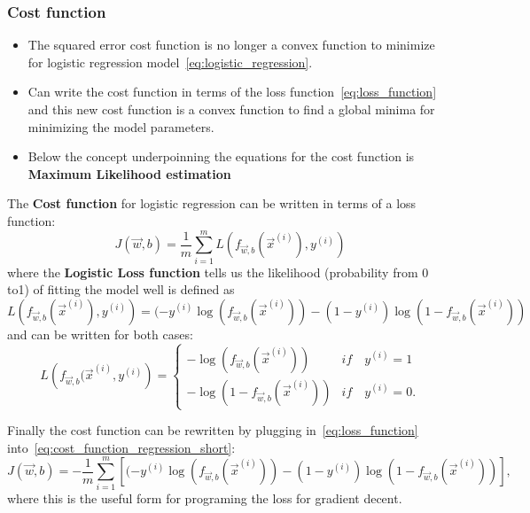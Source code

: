 \documentclass[11pt,letterpaper]{article}
\begin{document}
\newpage
\subsubsection{Cost function}

\begin{notebox}
	\begin{itemize}
		\item The squared error cost function is no longer a convex function to minimize for logistic regression model~\cref{eq:logistic_regression}.
		\item Can write the cost function in terms of the loss function~\cref{eq:loss_function} and this new cost function is a convex function to find a global minima for minimizing the model parameters.
		\item Below the concept underpoinning the equations for the cost function is \textbf{Maximum Likelihood estimation} 
	\end{itemize}
\end{notebox}

\begin{definitionbox}
	The \textbf{Cost function} for logistic regression can be written in terms of a loss function:
	\begin{equation}\label{eq:cost_function_regression_short}
		J(\vec{w},b) = \frac{1}{m} \sum \limits^{m}_{i=1} L \left( f_{\vec{w},b} (\vec{x}^{(i)}),y^{(i)}\right)
	\end{equation}
	where the \textbf{Logistic Loss function} tells us the likelihood (probability from 0 to1) of fitting the model well is defined as
	\begin{equation}\label{eq:loss_function}
		L\left( f_{\vec{w},b}(\vec{x}^{(i)}), y^{(i)}\right) = (-y^{(i)} \log\left(f_{\vec{w},b}\left( \vec{x}^{(i)} \right) \right) - \left( 1 - y^{(i)}\right) \log \left( 1 - f_{\vec{w},b}\left( \vec{x}^{(i)} \right) \right)
	\end{equation}
	and can be written for both cases:
	\begin{equation}\label{eq:loss_function_cases}
		L \left( f_{\vec{w},b} ( \vec{x}^{(i)},y^{(i)}\right) =
		\begin{cases}
			-\log \left( f_{\vec{w},b} (\vec{x}^{(i)}) \right) & \textit{if}\quad y^{(i)} = 1 \\
			-\log \left( 1 - f_{\vec{w},b} (\vec{x}^{(i)}) \right) & \textit{if}\quad y^{(i)} = 0.
		\end{cases}
	\end{equation}
	
	Finally the cost function can be rewritten by plugging in~\cref{eq:loss_function} into~\cref{eq:cost_function_regression_short}: 
	\begin{equation}\label{eq:cost_function_regression_long}
		\boxed{J(\vec{w},b) = -\frac{1}{m} \sum \limits^{m}_{i=1} \left[
(-y^{(i)} \log\left(f_{\vec{w},b}\left( \vec{x}^{(i)} \right) \right) - \left( 1 - y^{(i)}\right) \log \left( 1 - f_{\vec{w},b}\left( \vec{x}^{(i)} \right) \right)\right],}
	\end{equation}
	where this is the useful form for programing the loss for gradient decent.
\end{definitionbox}
\end{document}
